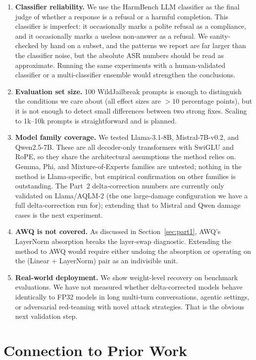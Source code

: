 \documentclass[11pt]{article}
\begin{document}
\begin{enumerate}
    \item \textbf{Classifier reliability.} We use the HarmBench LLM classifier as the final judge of whether a response is a refusal or a harmful completion. This classifier is imperfect: it occasionally marks a polite refusal as a compliance, and it occasionally marks a useless non-answer as a refusal. We sanity-checked by hand on a subset, and the patterns we report are far larger than the classifier noise, but the absolute ASR numbers should be read as approximate. Running the same experiments with a human-validated classifier or a multi-classifier ensemble would strengthen the conclusions.
    \item \textbf{Evaluation set size.} 100 WildJailbreak prompts is enough to distinguish the conditions we care about (all effect sizes are $>10$ percentage points), but it is not enough to detect small differences between two strong fixes. Scaling to 1k--10k prompts is straightforward and is planned.
    \item \textbf{Model family coverage.} We tested Llama-3.1-8B, Mistral-7B-v0.2, and Qwen2.5-7B. These are all decoder-only transformers with SwiGLU and RoPE, so they share the architectural assumptions the method relies on. Gemma, Phi, and Mixture-of-Experts families are untested; nothing in the method is Llama-specific, but empirical confirmation on other families is outstanding. The Part~2 delta-correction numbers are currently only validated on Llama/AQLM-2 (the one large-damage configuration we have a full delta-correction run for); extending that to Mistral and Qwen damage cases is the next experiment.
    \item \textbf{AWQ is not covered.} As discussed in Section~\ref{sec:part1}, AWQ's LayerNorm absorption breaks the layer-swap diagnostic. Extending the method to AWQ would require either undoing the absorption or operating on the (Linear + LayerNorm) pair as an indivisible unit.
    \item \textbf{Real-world deployment.} We show weight-level recovery on benchmark evaluations. We have not measured whether delta-corrected models behave identically to FP32 models in long multi-turn conversations, agentic settings, or adversarial red-teaming with novel attack strategies. That is the obvious next validation step.
\end{enumerate}

\section{Connection to Prior Work}
\label{sec:related}
\end{document}
